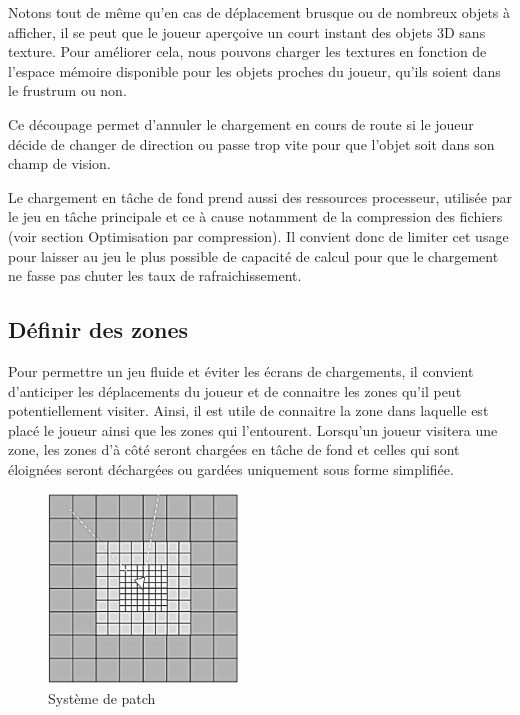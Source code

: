 \documentclass[a4paper, 11pt]{article} %
\begin{document}
Notons tout de même qu'en cas de déplacement brusque ou de nombreux objets à afficher, il se peut que le joueur aperçoive un court instant des objets 3D sans texture. Pour améliorer cela, nous pouvons charger les textures en fonction de l'espace mémoire disponible pour les objets proches du joueur, qu'ils soient dans le frustrum ou non.

Ce découpage permet d'annuler le chargement en cours de route si le joueur décide de changer de direction ou passe trop vite pour que l'objet soit dans son champ de vision.

Le chargement en tâche de fond prend aussi des ressources processeur, utilisée par le jeu en tâche principale et ce à cause notamment de la compression des fichiers (voir section Optimisation par compression). Il convient donc de limiter cet usage pour laisser au jeu le plus possible de capacité de calcul pour que le chargement ne fasse pas chuter les taux de rafraichissement.

\newpage
\subsection{Définir des zones}
Pour permettre un jeu fluide et éviter les écrans de chargements, il convient d'anticiper les déplacements du joueur et de connaitre les zones qu'il peut potentiellement visiter. Ainsi, il est utile de connaitre la zone dans laquelle est placé le joueur ainsi que les zones qui l'entourent. Lorsqu'un joueur visitera une zone, les zones d'à côté seront chargées en tâche de fond et celles qui sont éloignées seront déchargées ou gardées uniquement sous forme simplifiée.

\begin{figure}
\begin{center}
\includegraphics[width=0.45\textwidth]{images/patch-system-three.png}
\end{center}
\caption{Système de patch}
\end{figure}
\end{document}
